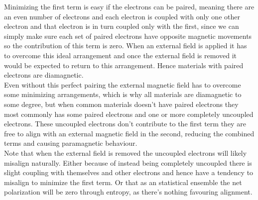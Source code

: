 Minimizing the first term is easy if the electrons can be paired,
meaning there are an even number of electrons and each electron is coupled with only one other electron and that electron is in turn coupled only with the first,
since we can simply make sure each set of paired electrons have opposite magnetic movements so the contribution of this term is zero.
When an external field is applied it has to overcome this ideal arrangement and once the external field is removed it would be expected to return to this arrangement.
Hence materials with paired electrons are diamagnetic.
\\

Even without this perfect pairing the external magnetic field has to overcome some minimizing arrangements,
which is why all materials are diamagnetic to some degree,
but when common materials doesn't have paired electrons they most commonly has some paired electrons and one or more completely uncoupled electrons.
These uncoupled electrons don't contribute to the first term they are free to align with an external magnetic field in the second,
reducing the combined terms and causing paramagnetic behaviour.
\\

Note that when the external field is removed the uncoupled electrons will likely misalign naturally.
Either because of instead being completely uncoupled there is slight coupling with themselves and other electrons and hence have a tendency to misalign to minimize the first term.
Or that as an statistical ensemble the net polarization will be zero through entropy,
as there's nothing favouring alignment.

